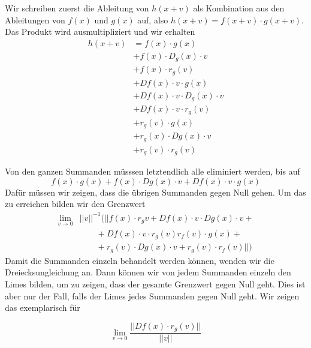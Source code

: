 Wir schreiben zuerst die Ableitung von $h(x+v)$ als Kombination aus den Ableitungen von $f(x)$ und $g(x)$ auf, also $h(x+v) =  f(x+v)\cdot g(x+v)$.
Das Produkt wird ausmultipliziert und wir erhalten
\begin{equation*}
\begin{split} h(x+v) & = f(x) \cdot g(x) \\ & + f(x)  \cdot D_{g}(x) \cdot v \\ & + f(x) \cdot r_{g}(v) \\ & + Df(x) \cdot v \cdot g(x) \\ & +  Df(x) \cdot v \cdot D_{g}(x) \cdot v  \\ & + Df(x) \cdot v \cdot r_{g}(v) \\ & +  r_{g}(v) \cdot g(x) \\ & + r_{g}(x) \cdot Dg(x) \cdot v \\ & + r_{g}(v) \cdot r_{g}(v) \end{split} \end{equation*}   %

Von den ganzen Summanden müsssen letztendlich alle eliminiert werden, bis auf 
\begin{equation*} f(x) \cdot g(x) + f(x) \cdot Dg(x) \cdot v + Df(x) \cdot v \cdot g(x) \end{equation*} 
Dafür müssen wir zeigen, dass die übrigen Summanden gegen Null gehen. Um das zu erreichen bilden wir den Grenzwert
\begin{align*}
\lim \limits_{v \rightarrow 0} &||v||^{-1}(||f(x) \cdot r_{g}v + Df(x) \cdot v \cdot Dg(x) \cdot v +{}\\
&\qquad + Df(x) \cdot v \cdot r_{g}(v) r_{f}(v) \cdot g(x) +{}\\
&\qquad + r_{g}(v) \cdot Dg(x) \cdot v + r_{g}(v) \cdot r_{f}(v)||)
\end{align*}
Damit die Summanden einzeln behandelt werden können, wenden wir die Dreiecksungleichung an. Dann können wir von jedem Summanden einzeln den Limes bilden, um zu zeigen, dass der gesamte Grenzwert gegen Null geht. Dies ist aber nur der Fall, falls der Limes jedes Summanden gegen Null geht. Wir zeigen das exemplarisch für 

\begin{equation*}
\lim\limits_{v \rightarrow 0} \frac{||Df(x) \cdot r_{g}(v)||}{||v||}
\end{equation*}

